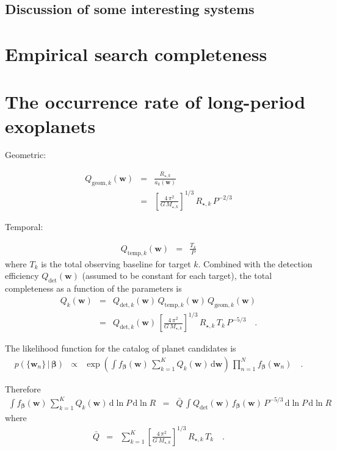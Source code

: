 \documentclass[onecolumn]{aastex6}
\newcommand{\dd}{\ensuremath{\,\mathrm{d}}}
\newcommand{\bvec}[1]{{\ensuremath{\boldsymbol{#1}}}}
\newcommand{\params}{{\ensuremath{\bvec{w}}}}
\newcommand{\poppars}{{\ensuremath{\bvec{\beta}}}}
\begin{document}
\subsection{Discussion of some interesting systems}



\section{Empirical search completeness}


\section{The occurrence rate of long-period exoplanets}

Geometric:

\begin{eqnarray}
Q_{\mathrm{geom},k} (\params) &=& \frac{R_{\star,k}}{a_k(\params)} \\
&=& \left[\frac{4\,\pi^2}{G\,M_{\star,k}}\right]^{1/3}\,R_{\star,k}\,P^{-2/3}
\end{eqnarray}

Temporal:

\begin{eqnarray}
Q_{\mathrm{temp},k} (\params) &=& \frac{T_k}{P}
\end{eqnarray}
where $T_k$ is the total observing baseline for target $k$.
Combined with the detection efficiency $Q_{\mathrm{det}}(\params)$ (assumed to
be constant for each target), the total completeness as a function of the
parameters is
\begin{eqnarray}
Q_k(\params) &=& Q_{\mathrm{det},k}(\params) \,
                 Q_{\mathrm{temp},k} (\params) \,
                 Q_{\mathrm{geom},k} (\params) \\
&=& Q_{\mathrm{det},k}(\params) \,
    \left[\frac{4\,\pi^2}{G\,M_{\star,k}}\right]^{1/3}\,
    R_{\star,k}\,T_k\,P^{-5/3} \quad.
\end{eqnarray}

The likelihood function for the catalog of planet candidates is
\begin{eqnarray}
p(\{\params_n\}\,|\,\poppars) &\propto&
    \exp \left(
        \int f_\poppars (\params)\,\sum_{k=1}^K Q_k(\params) \dd\params
    \right) \, \prod_{n=1}^N f_\poppars (\params_n) \quad.
\end{eqnarray}

Therefore
\begin{eqnarray}
\int f_\poppars (\params)\,\sum_{k=1}^K Q_k(\params) \dd\ln P\dd\ln R &=&
    \bar{Q}\,\int Q_{\mathrm{det}}(\params)\,f_\poppars(\params)\,P^{-5/3}
        \dd\ln P\dd\ln R
\end{eqnarray}
where
\begin{eqnarray}
\bar{Q} &=& \sum_{k=1}^K
    \left[\frac{4\,\pi^2}{G\,M_{\star,k}}\right]^{1/3}\,R_{\star,k}\,T_k
\quad.
\end{eqnarray}
\end{document}
